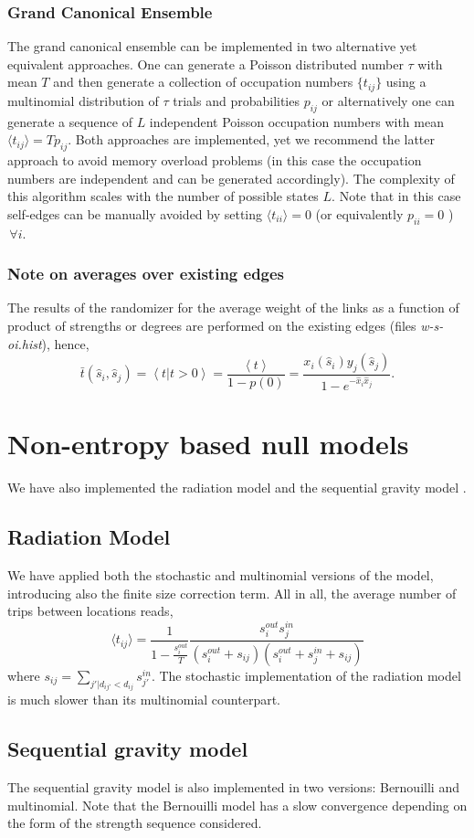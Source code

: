 \documentclass[aps,floatfix,noshowpacs,superscriptaddress]{revtex4}
\newcommand{\ave}[1]{\left \langle #1 \right \rangle}
\begin{document}
\subsubsection{Grand Canonical Ensemble}
The grand canonical ensemble can be implemented in two alternative yet equivalent approaches. One can generate a Poisson distributed number $\tau$ with mean $T$ and then generate a collection of occupation numbers $\{t_{ij}\}$ using a multinomial distribution of $\tau$ trials and probabilities $p_{ij}$ or alternatively one can generate a sequence of $L$ independent Poisson occupation numbers with mean $\langle t_{ij} \rangle = Tp_{ij}$. Both approaches are implemented, yet we recommend the latter approach to avoid memory overload problems (in this case the occupation numbers are independent and can be generated accordingly). The complexity of this algorithm scales with the number of possible states $L$. Note that in this case self-edges can be manually avoided by setting $\langle t_{ii} \rangle = 0$ (or equivalently $p_{ii} = 0$ ) $\, \forall i$.


\subsubsection{Note on averages over existing edges}
The results of the randomizer for the average weight of the links as a function of product of strengths or degrees are performed on the existing edges (files \textit{w-s-oi.hist}), hence,
\[
\bar{t} (\hat{s}_i,\hat{s}_j)= \ave{t | t>0 } = \frac{\ave{t}}{1-p(0)} = \frac{x_i(\hat{s}_i) y_j(\hat{s}_j)}{1-e^{-\hat{x}_i \hat{x}_j }}.
\]



\section{Non-entropy based null models}
We have also implemented the radiation model \cite{Simini2012a} and the sequential gravity model \cite{Lenormand2012}.

\subsection{Radiation Model}
We have applied both the stochastic and multinomial versions of the model, introducing also the finite size correction term. All in all, the average number of trips between locations reads,
\begin{equation}
\langle t_{ij} \rangle = \frac{1}{1-\frac{s_i^{out}}{T}} \frac{s_i^{out} s_j^{in}}{(s_i^{out} + s_{ij})(s_i^{out} + s_j^{in} +s_{ij}) }
\end{equation}
where $s_{ij} = \sum_{j'|d_{ij'}<d_{ij}} s_{j'}^{in}$. The stochastic implementation of the radiation model is much slower than its multinomial counterpart.

\subsection{Sequential gravity model}
The sequential gravity model is also implemented in two versions: Bernouilli and multinomial. Note that the Bernouilli model has a slow convergence depending on the form of the strength sequence considered.




\end{document}
